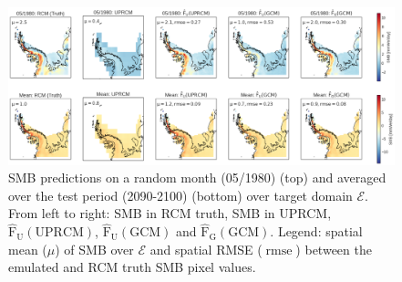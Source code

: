 \documentclass[a4paper,11pt,oneside]{report}
\begin{document}
\begin{figure}[thb]
  \centering
  \includegraphics[width=\columnwidth]{doc/Thesis-latex/images/results/geoplots_RCM_GCM.pdf}
  \caption []{\small SMB predictions on a random month (05/1980) (top) and averaged over the test period (2090-2100) (bottom) over target domain $\mathcal{E}$. From left to right: SMB in RCM truth, SMB in UPRCM, $\operatorname{\hat{F}_{U}(UPRCM)}$, $\operatorname{\hat{F}_{U}(GCM)}$ and $\operatorname{\hat{F}_{G}(GCM)}$. Legend: spatial mean ($\mu$) of SMB over $\mathcal{E}$ and spatial RMSE ($\operatorname{rmse}$) between the emulated and RCM truth SMB pixel values.}
  \vspace{-3mm}
  \label{fig:geoplots-GCM-RCM}
\end{figure}
\end{document}

